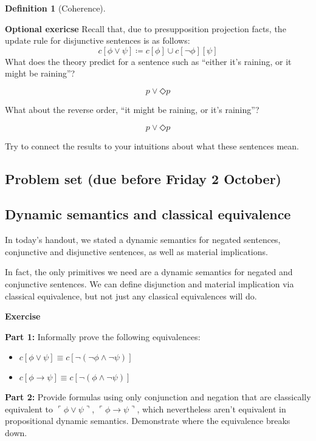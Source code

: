\documentclass[nols,twoside,nofonts,nobib,nohyper]{tufte-handout}
\theoremstyle{definition}
\newtheorem{definition}{Definition}[section]
\begin{document}
\begin{definition}[Coherence]
{}

\begin{tcolorbox}
  \textbf{Optional exericse}
  \tcblower
Recall that, due to presupposition projection facts, the update rule for disjunctive sentences is as follows:
$$
c[ϕ ∨ ψ] ≔ c[ϕ] ∪ c[¬ ϕ][ψ]
$$
What does the theory predict for a sentence such as \enquote{either it's raining, or it might be raining}?

$$
p ∨ ◇ p
$$

What about the reverse order, \enquote{it might be raining, or it's raining}?

$$
 p ∨ ◇ p
$$

Try to connect the results to your intuitions about what these sentences mean.
\end{tcolorbox}

\printbibliography

\begin{appendices}

  \section{Problem set (due before Friday 2 October)}

  \subsection{Dynamic semantics and classical equivalence}

  In today's handout, we stated a dynamic semantics for negated sentences, conjunctive and disjunctive sentences, as well as material implications.

  In fact, the only primitives we need are a dynamic semantics for negated and conjunctive sentences. We can define disjunction and material implication via classical equivalence, but not just any classical equivalences will do.

  \begin{tcolorbox}
    \textbf{Exercise}
    \tcblower

    \textbf{Part 1:} Informally prove the following equivalences:
    \begin{itemize}
        \item $c[ϕ ∨ ψ] ≡ c[¬ (¬ ϕ ∧ ¬ ψ)]$
        \item $c[ϕ → ψ] ≡ c[¬ (ϕ ∧ ¬ ψ)]$
    \end{itemize}

    \textbf{Part 2:} Provide formulas using only conjunction and negation that are classically equivalent to $⌜ϕ ∨ ψ⌝$, $⌜ϕ→ψ⌝$, which nevertheless aren't equivalent in propositional dynamic semantics. Demonstrate where the equivalence breaks down.


\end{tcolorbox}
\end{appendices}
\end{definition}
\end{document}
